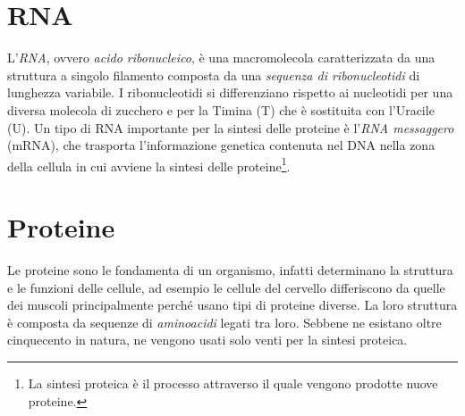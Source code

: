 \section{RNA}
L'\textit{RNA}, ovvero \textit{acido ribonucleico}, è una macromolecola caratterizzata da una struttura a singolo filamento composta da una \textit{sequenza di ribonucleotidi} di lunghezza variabile.
\newline
I ribonucleotidi si differenziano rispetto ai nucleotidi per una diversa molecola di zucchero e per la Timina (T) che è sostituita con l'Uracile (U).
\newline
Un tipo di RNA importante per la sintesi delle proteine è l'\textit{RNA messaggero} (mRNA), che trasporta l'informazione genetica contenuta nel DNA nella zona della cellula in cui avviene la sintesi delle proteine\footnote{La sintesi proteica è il processo attraverso il quale vengono prodotte nuove proteine.}.

\section{Proteine}
Le proteine sono le fondamenta di un organismo, infatti determinano la struttura e le funzioni delle cellule, ad esempio le cellule del cervello differiscono da quelle dei muscoli principalmente perché usano tipi di proteine diverse.
La loro struttura è composta da sequenze di \textit{aminoacidi} legati tra loro. Sebbene ne esistano oltre cinquecento in natura, ne vengono usati solo venti per la sintesi proteica.